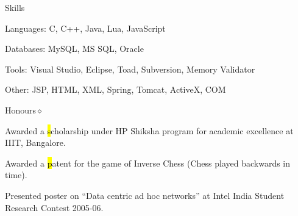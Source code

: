 \documentclass{resume}
\begin{document}
\begin{category}{Skills}{}

    \item {\topic Languages:} C, C++, Java, Lua, JavaScript
    \item {\topic Databases:} MySQL, MS SQL, Oracle
    \item {\topic Tools:} Visual Studio,  Eclipse, Toad, Subversion, Memory
        Validator
    \item {\topic Other:} JSP, HTML, XML, Spring, Tomcat,  ActiveX, COM

\end{category}


\begin{category}{Honours}{$\diamond$}

    \item Awarded a {\hl scholarship} under HP Shiksha program for academic
        excellence at IIIT, Bangalore.

    \item Awarded a {\hl patent} for the game of Inverse Chess (Chess played
        backwards in time).

    \item Presented poster on ``Data centric ad hoc networks'' at Intel India
        Student Research Contest 2005-06.

\end{category}
\end{document}
